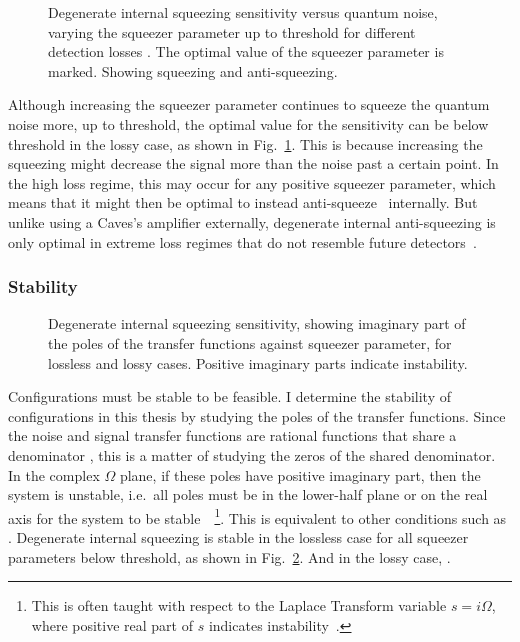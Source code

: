 \begin{figure}
	\centering
	\caption{Degenerate internal squeezing sensitivity versus quantum noise, varying the squeezer parameter up to threshold for different detection losses . The optimal value of the squeezer parameter is marked. Showing squeezing and anti-squeezing.}
	\label{fig:dIS_noise_budget}
\end{figure}

Although increasing the squeezer parameter continues to squeeze the quantum noise more, up to threshold, the optimal value for the sensitivity can be below threshold in the lossy case, as shown in Fig.~\ref{fig:dIS_noise_budget}. This is because increasing the squeezing might decrease the signal more than the noise past a certain point. In the high loss regime, this may occur for any positive squeezer parameter, which means that it might then be optimal to instead anti-squeeze~\cite{Korobko talk} internally. But unlike using a Caves's amplifier externally, degenerate internal anti-squeezing is only optimal in extreme loss regimes that do not resemble future detectors~\cite{}. 

\subsubsection{Stability}

\begin{figure}
	\centering
	\caption{Degenerate internal squeezing sensitivity, showing imaginary part of the poles of the transfer functions against squeezer parameter, for lossless and lossy cases. Positive imaginary parts indicate instability.}
	\label{fig:dIS_stability}
\end{figure}

Configurations must be stable to be feasible. I determine the stability of configurations in this thesis by studying the poles of the transfer functions. Since the noise and signal transfer functions are rational functions that share a denominator , this is a matter of studying the zeros of the shared denominator. In the complex $\Omega$ plane, if these poles have positive imaginary part, then the system is unstable, i.e.\ all poles must be in the lower-half plane or on the real axis for the system to be stable~\cite{}~\footnote{This is often taught with respect to the Laplace Transform variable $s=i\Omega$, where positive real part of $s$ indicates instability~\cite{}.}. This is equivalent to other conditions such as . Degenerate internal squeezing is stable in the lossless case for all squeezer parameters below threshold, as shown in Fig.~\ref{fig:dIS_stability}. And in the lossy case, .



